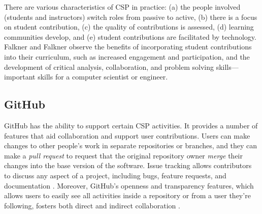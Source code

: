 There are various characteristics of CSP in practice: (a) the people involved (students and instructors) switch roles from passive to active, (b) there is a focus on student contribution, (c) the quality of contributions is assessed, (d) learning communities develop, and (e) student contributions are facilitated by technology. Falkner and Falkner \cite{falkner2012supporting} observe the benefits of incorporating student contributions into their curriculum, such as increased engagement and participation, and the development of critical analysis, collaboration, and problem solving skills---important skills for a computer scientist or engineer.

\subsection{GitHub}
GitHub has the ability to support certain CSP activities. 
It provides a number of features that aid collaboration and support user contributions. Users can make changes to other people's work in separate repositories or branches, and they can make a \emph{pull request} to request that the original repository owner \emph{merge} their changes into the base version of the software. Issue tracking allows contributors to discuss any aspect of a project, including bugs, feature requests, and documentation \cite{bissyande2013got}. Moreover, GitHub's openness and transparency features, which allows users to easily see all activities inside a repository or from a user they're following, fosters both direct and indirect collaboration \cite{dabbish2012social}.

